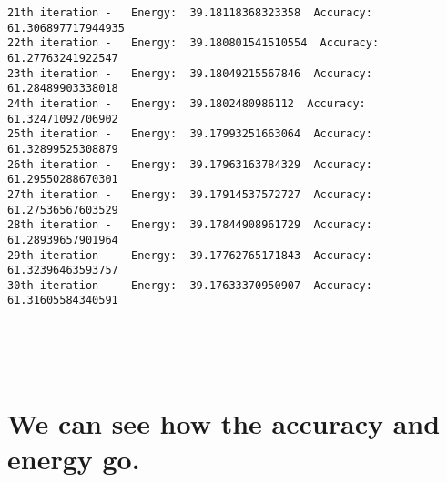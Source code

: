 \documentclass[11pt]{article}
\begin{document}
    \begin{Verbatim}[commandchars=\\\{\}]
21th iteration -   Energy:  39.18118368323358  Accuracy:  61.306897717944935
22th iteration -   Energy:  39.180801541510554  Accuracy:  61.27763241922547
23th iteration -   Energy:  39.18049215567846  Accuracy:  61.28489903338018
24th iteration -   Energy:  39.1802480986112  Accuracy:  61.32471092706902
25th iteration -   Energy:  39.17993251663064  Accuracy:  61.32899525308879
26th iteration -   Energy:  39.17963163784329  Accuracy:  61.29550288670301
27th iteration -   Energy:  39.17914537572727  Accuracy:  61.27536567603529
28th iteration -   Energy:  39.17844908961729  Accuracy:  61.28939657901964
29th iteration -   Energy:  39.17762765171843  Accuracy:  61.32396463593757
30th iteration -   Energy:  39.17633370950907  Accuracy:  61.31605584340591

    \end{Verbatim}

    \begin{center}
    \end{center}
    { \hspace*{\fill} \\}
    
    \begin{center}
    \end{center}
    { \hspace*{\fill} \\}
    
    \hypertarget{we-can-see-how-the-accuracy-and-energy-go.}{%
\section{We can see how the accuracy and energy
go.}\label{we-can-see-how-the-accuracy-and-energy-go.}}


    
    
    
    
\end{document}
